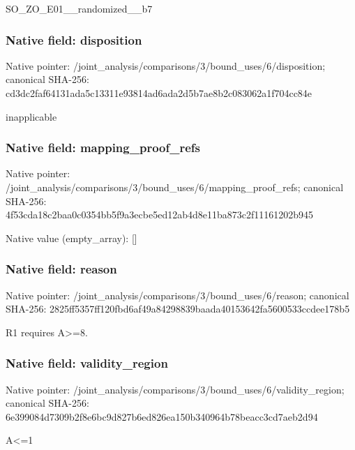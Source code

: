 \documentclass[10pt,a4paper]{article}
\begin{document}
\begingroup\raggedright\sloppy SO\_\allowbreak{}ZO\_\allowbreak{}E01\_\allowbreak{}\_\allowbreak{}randomized\_\allowbreak{}\_\allowbreak{}b7\par\endgroup

\subsubsection{Native field: disposition}
Native pointer: /joint\_\allowbreak{}analysis/comparisons/3/bound\_\allowbreak{}uses/6/disposition; canonical SHA-256: cd3dc2faf64131ada5c13311e93814ad6ada2d5b7ae8b2c083062a1f704cc84e

\begingroup\raggedright\sloppy inapplicable\par\endgroup

\subsubsection{Native field: mapping\_\allowbreak{}proof\_\allowbreak{}refs}
Native pointer: /joint\_\allowbreak{}analysis/comparisons/3/bound\_\allowbreak{}uses/6/mapping\_\allowbreak{}proof\_\allowbreak{}refs; canonical SHA-256: 4f53cda18c2baa0c0354bb5f9a3ecbe5ed12ab4d8e11ba873c2f11161202b945

Native value (empty\_\allowbreak{}array): []

\subsubsection{Native field: reason}
Native pointer: /joint\_\allowbreak{}analysis/comparisons/3/bound\_\allowbreak{}uses/6/reason; canonical SHA-256: 2825ff5357ff120fbd6af49a84298839baada40153642fa5600533ccdee178b5

\begingroup\raggedright\sloppy R1 requires A>=\allowbreak{}8.\par\endgroup

\subsubsection{Native field: validity\_\allowbreak{}region}
Native pointer: /joint\_\allowbreak{}analysis/comparisons/3/bound\_\allowbreak{}uses/6/validity\_\allowbreak{}region; canonical SHA-256: 6e399084d7309b2f8e6bc9d827b6ed826ea150b340964b78beacc3cd7aeb2d94

\begingroup\raggedright\sloppy A<=\allowbreak{}1\par\endgroup
\end{document}
